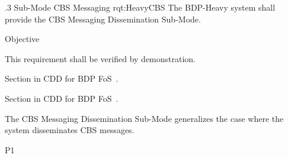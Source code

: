 \ONERQMTVKPP
{\RqtNumberBase.3}
{Sub-Mode CBS Messaging}
{rqt:HeavyCBS}
{The BDP-Heavy system shall provide the CBS Messaging Dissemination Sub-Mode.}
{
	\item [Phase 1] Objective
}
{This requirement shall be verified by demonstration.}
{
\item [3.2.1] Section in CDD for BDP FoS~\cite{ref__BDP_FOS_CDD}.
\item [5.1.3] Section in CDD for BDP FoS~\cite{ref__BDP_FOS_CDD}.
}
{
	\item The CBS Messaging Dissemination Sub-Mode generalizes the case where the system disseminates CBS messages.
}
{P1}
